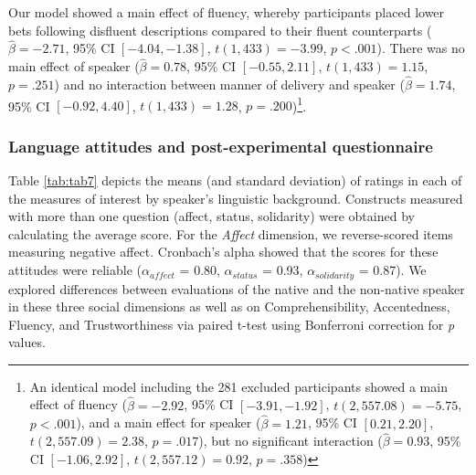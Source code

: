 \documentclass[
  man,floatsintext]{apa7}
\begin{document}
Our model showed a main effect of fluency, whereby participants placed lower bets following disfluent descriptions compared to their fluent counterparts (\(\hat{\beta} = -2.71\), 95\% CI \([-4.04, -1.38]\), \(t(1,433) = -3.99\), \(p < .001\)). There was no main effect of speaker (\(\hat{\beta} = 0.78\), 95\% CI \([-0.55, 2.11]\), \(t(1,433) = 1.15\), \(p = .251\)) and no interaction between manner of delivery and speaker (\(\hat{\beta} = 1.74\), 95\% CI \([-0.92, 4.40]\), \(t(1,433) = 1.28\), \(p = .200\))\footnote{An identical model including the 281 excluded participants showed a main effect of fluency (\(\hat{\beta} = -2.92\), 95\% CI \([-3.91, -1.92]\), \(t(2,557.08) = -5.75\), \(p < .001\)), and a main effect for speaker (\(\hat{\beta} = 1.21\), 95\% CI \([0.21, 2.20]\), \(t(2,557.09) = 2.38\), \(p = .017\)), but no significant interaction (\(\hat{\beta} = 0.93\), 95\% CI \([-1.06, 2.92]\), \(t(2,557.12) = 0.92\), \(p = .358\))}.

\hypertarget{language-attitudes-and-post-experimental-questionnaire}{%
\subsubsection{Language attitudes and post-experimental questionnaire}\label{language-attitudes-and-post-experimental-questionnaire}}

Table \ref{tab:tab7} depicts the means (and standard deviation) of ratings in each of the measures of interest by speaker's linguistic background. Constructs measured with more than one question (affect, status, solidarity) were obtained by calculating the average score. For the \emph{Affect} dimension, we reverse-scored items measuring negative affect. Cronbach's alpha showed that the scores for these attitudes were reliable (\(\alpha_{affect}\) = 0.80, \(\alpha_{status}\) = 0.93, \(\alpha_{solidarity}\) = 0.87). We explored differences between evaluations of the native and the non-native speaker in these three social dimensions as well as on Comprehensibility, Accentedness, Fluency, and Trustworthiness via paired t-test using Bonferroni correction for \emph{p} values.
\end{document}
